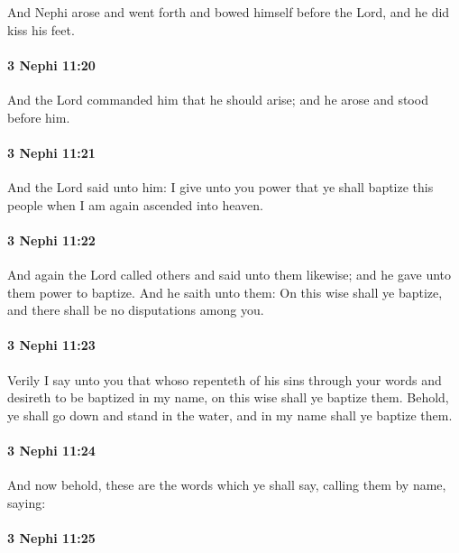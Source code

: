 			And Nephi arose and went forth and bowed himself before the Lord,
			and he did kiss his feet.

		\paragraph{3 Nephi 11:20} %
			\label{3NEPHI-11-20}

			And the Lord commanded him that he should arise;
			and he arose and stood before him.

		\paragraph{3 Nephi 11:21} %
			\label{3NEPHI-11-21}

			And the Lord said unto him:
			I give unto you power that ye shall baptize this people
			when I am again ascended into heaven.

		\paragraph{3 Nephi 11:22} %
			\label{3NEPHI-11-22}

			And again the Lord called others and said unto them likewise;
			and he gave unto them power to baptize.
			And he saith unto them:
			On this wise shall ye baptize,
			and there shall be no disputations among you.

		\paragraph{3 Nephi 11:23} %
			\label{3NEPHI-11-23}

			Verily I say unto you
			that whoso repenteth of his sins through your words
			and desireth to be baptized in my name,
			on this wise shall ye baptize them.
			Behold, ye shall go down and stand in the water,
			and in my name shall ye baptize them.

		\paragraph{3 Nephi 11:24} %
			\label{3NEPHI-11-24}

			And now behold, these are the words which ye shall say,
			calling them by name, saying:

		\paragraph{3 Nephi 11:25} %
			\label{3NEPHI-11-25}

